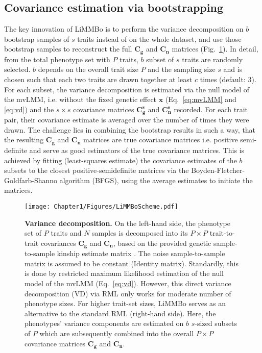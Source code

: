 \subsection{Covariance estimation via bootstrapping}
The key innovation of LiMMBo is to perform the variance decomposition on \(b\) bootstrap samples of \(s\) traits instead of on the whole dataset, and use those bootstrap samples to reconstruct the full \(\mathbf{C_g}\) and \(\mathbf{C_n}\) matrices (Fig.~\ref{fig:vd}). In detail, from the total phenotype set with \(P\) traits, \(b\) subset of \(s\) traits are randomly selected. \(b\) depends on the overall trait size \(P\) and the sampling size \(s\) and is chosen such that each two traits are drawn together at least \(c\) times (default: 3). For each subset, the variance decomposition is estimated via the null model of the mvLMM, i.e. without the fixed genetic effect \(\mathbf{x}\) (Eq.~\ref{eq:mvLMM} and \ref{eq:vd}) and the $s \times s$ covariance matrices $\mathbf{C^s_g}$ and $\mathbf{C^s_n}$ recorded.  For each trait pair, their covariance estimate is averaged over the number of times they were drawn. The challenge lies in combining the bootstrap results in such a way, that the resulting \(\mathbf{C_g}\) and \(\mathbf{C_n}\) matrices are true covariance matrices i.e. positive semi-definite and serve as good estimators of the true covariance matrices. This is achieved by fitting (least-squares estimate) the covariance estimates of the \(b\) subsets to the closest positive-semidefinite matrices via the Boyden-Fletcher-Goldfarb-Shanno algorithm (BFGS)\citep{Byrd1995}, using the average estimates to initiate the matrices. 

\begin{figure}[hbtp]
	\centering
	\texttt{[image: Chapter1/Figures/LiMMBoScheme.pdf]}
	\caption{\textbf{Variance decomposition.} On the left-hand side, the phenotype set of \(P\) traits and \(N\) samples is decomposed into its \(P \times P\) trait-to-trait covariances \(\mathbf{C_g}\) and \(\mathbf{C_n}\), based on the provided genetic sample-to-sample kinship estimate matrix . The noise sample-to-sample matrix is assumed to be constant (Identity matrix). Standardly, this is done by restricted maximum likelihood estimation of the null model of the mvLMM (Eq.~\ref{eq:vd}). However, this direct variance decomposition (VD) via RML only works for moderate number of phenotype sizes. For higher trait-set sizes, LiMMBo serves as an alternative to the standard RML (right-hand side). Here, the phenotypes' variance components are estimated on \(b\) \(s\)-sized subsets of \(P\) which are subsequently combined into the overall \(P \times P\) covariance matrices \(\mathbf{C_g}\) and \(\mathbf{C_n}\).} 
	 	\label{fig:vd}
\end{figure}


